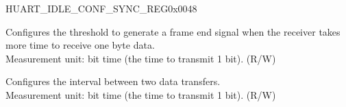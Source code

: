 \begin{register}{H}{UART\_IDLE\_CONF\_SYNC\_REG}{0x0048}\label{regdesc:UARTIDLECONFSYNCREG}
%
%
%
\regnewline%
\begin{regdesc}\begin{reglist}
\label{fielddesc:UARTRXIDLETHRHD}\item [UART\_RX\_IDLE\_THRHD] Configures the threshold to generate a frame end signal when the receiver takes more time to receive one byte data.\\Measurement unit: bit time (the time to transmit 1 bit). (R/W)
\label{fielddesc:UARTTXIDLENUM}\item [UART\_TX\_IDLE\_NUM] Configures the interval between two data transfers.\\Measurement unit: bit time (the time to transmit 1 bit). (R/W)
\end{reglist}\end{regdesc}
\end{register}



